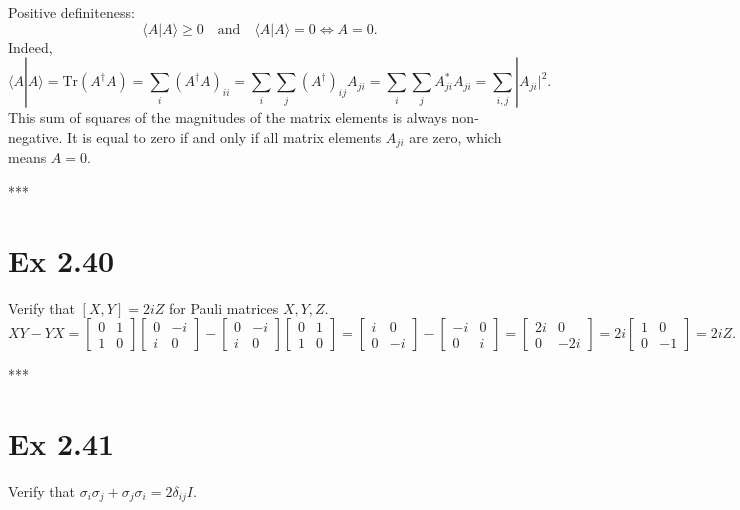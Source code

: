\documentclass{article}
\newcommand{\0}{{$|0\rangle$}}
\newcommand{\1}{{$|1\rangle$}}
\begin{document}
Positive definiteness:  
$$
\langle A|A \rangle \ge 0 \quad \text{and} \quad \langle A|A \rangle = 0 \iff A=0.
$$  
Indeed,  
$$
\langle A|A \rangle = \text{Tr}(A^\dagger A) = \sum_i (A^\dagger A)_{ii} = \sum_i \sum_j (A^\dagger)_{ij} A_{ji} = \sum_i \sum_j A^*_{ji} A_{ji} = \sum_{i,j} |A_{ji}|^2.
$$  
This sum of squares of the magnitudes of the matrix elements is always non-negative. It is equal to zero if and only if all matrix elements $A_{ji}$ are zero, which means $A=0$.

***

\newpage
\section*{Ex 2.40 } 
Verify that $[X,Y] = 2iZ$ for Pauli matrices $X, Y, Z$.  
$$
XY - YX = \begin{bmatrix} 0 & 1 \\ 1 & 0 \end{bmatrix} \begin{bmatrix} 0 & -i \\ i & 0 \end{bmatrix} - \begin{bmatrix} 0 & -i \\ i & 0 \end{bmatrix} \begin{bmatrix} 0 & 1 \\ 1 & 0 \end{bmatrix} = \begin{bmatrix} i & 0 \\ 0 & -i \end{bmatrix} - \begin{bmatrix} -i & 0 \\ 0 & i \end{bmatrix} = \begin{bmatrix} 2i & 0 \\ 0 & -2i \end{bmatrix} = 2i \begin{bmatrix} 1 & 0 \\ 0 & -1 \end{bmatrix} = 2iZ.
$$

***


\newpage
\section*{Ex 2.41 } 
Verify that $\sigma_i \sigma_j + \sigma_j \sigma_i = 2 \delta_{ij} I$.  
\end{document}
